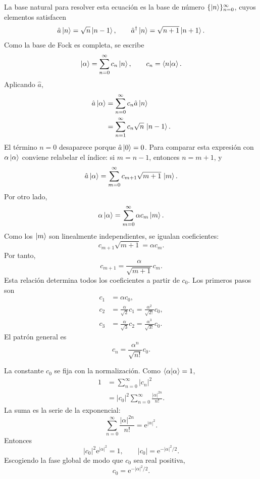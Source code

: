 \documentclass[11pt]{article}
\newcommand{\ee}{\mathrm{e}}
\newcommand{\adag}{\hat a^\dagger}
\begin{document}
La base natural para resolver esta ecuaci\'on es la base de n\'umero
$\{\ket{n}\}_{n=0}^{\infty}$, cuyos elementos satisfacen
\begin{equation}
  \hat a\ket{n}=\sqrt{n}\ket{n-1},
  \qquad
  \adag\ket{n}=\sqrt{n+1}\ket{n+1}.
\end{equation}
Como la base de Fock es completa, se escribe
\begin{equation}
  \ket{\alpha}=\sum_{n=0}^{\infty}c_n\ket{n},
  \qquad c_n=\braket{n|\alpha}.
\end{equation}
Aplicando $\hat a$,
\begin{align}
  \hat a\ket{\alpha}
  &=\sum_{n=0}^{\infty}c_n\hat a\ket{n} \\
  &=\sum_{n=1}^{\infty}c_n\sqrt n\,\ket{n-1}.
\end{align}
El t\'ermino $n=0$ desaparece porque $\hat a\ket{0}=0$. Para comparar esta
expresi\'on con $\alpha\ket{\alpha}$ conviene relabelar el \'indice: si
$m=n-1$, entonces $n=m+1$, y
\begin{equation}
  \hat a\ket{\alpha}
  =\sum_{m=0}^{\infty}c_{m+1}\sqrt{m+1}\,\ket{m}.
\end{equation}
Por otro lado,
\begin{equation}
  \alpha\ket{\alpha}
  =\sum_{m=0}^{\infty}\alpha c_m\ket{m}.
\end{equation}
Como los $\ket m$ son linealmente independientes, se igualan coeficientes:
\begin{equation}
  c_{m+1}\sqrt{m+1}=\alpha c_m.
\end{equation}
Por tanto,
\begin{equation}
  c_{m+1}=\frac{\alpha}{\sqrt{m+1}}c_m.
\end{equation}
Esta relaci\'on determina todos los coeficientes a partir de $c_0$. Los
primeros pasos son
\begin{align}
  c_1&=\alpha c_0,\\
  c_2&=\frac{\alpha}{\sqrt2}c_1
      =\frac{\alpha^2}{\sqrt{2!}}c_0,\\
  c_3&=\frac{\alpha}{\sqrt3}c_2
      =\frac{\alpha^3}{\sqrt{3!}}c_0.
\end{align}
El patr\'on general es
\begin{equation}
  c_n=\frac{\alpha^n}{\sqrt{n!}}c_0.
\end{equation}

La constante $c_0$ se fija con la normalizaci\'on. Como
$\braket{\alpha|\alpha}=1$,
\begin{align}
  1
  &=\sum_{n=0}^{\infty}|c_n|^2\\
  &=|c_0|^2\sum_{n=0}^{\infty}\frac{|\alpha|^{2n}}{n!}.
\end{align}
La suma es la serie de la exponencial:
\begin{equation}
  \sum_{n=0}^{\infty}\frac{|\alpha|^{2n}}{n!}
  =\ee^{|\alpha|^2}.
\end{equation}
Entonces
\begin{equation}
  |c_0|^2\ee^{|\alpha|^2}=1,
  \qquad
  |c_0|=\ee^{-|\alpha|^2/2}.
\end{equation}
Escogiendo la fase global de modo que $c_0$ sea real positiva,
\begin{equation}
  c_0=\ee^{-|\alpha|^2/2}.
\end{equation}
\end{document}

